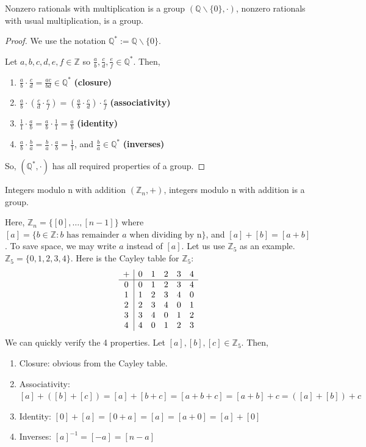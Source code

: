 \documentclass[12pt]{article}
\newcommand{\Z}{\mathbb{Z}}
\newcommand{\Q}{\mathbb{Q}}
\newcommand{\inv}{^{-1}}
\begin{document}
	\begin{myprop}{Nonzero rationals with multiplication is a group}{}
		$(\Q\backslash\{0\}, \cdot)$, nonzero rationals with usual multiplication, is a group. 
		\begin{proof}
			We use the notation $\Q^*:=\Q\backslash\{0\}$.
			
			Let $a, b, c, d, e, f\in\Z$ so $\frac{a}{b}, \frac{c}{d}, \frac{e}{f}\in\Q^*$. Then,
			\begin{enumerate}[label=(\roman*)]
				\item $\frac{a}{b}\cdot\frac{c}{d}=\frac{ac}{bd}\in\Q^*$ \textbf{(closure)}
				\item $\frac{a}{b}\cdot(\frac{c}{d}\cdot\frac{e}{f})=(\frac{a}{b}\cdot\frac{c}{d})\cdot\frac{e}{f}$ \textbf{(associativity)}
				\item $\frac{1}{1}\cdot\frac{a}{b}=\frac{a}{b}\cdot\frac{1}{1}=\frac{a}{b}$ \textbf{(identity)}
				\item $\frac{a}{b}\cdot\frac{b}{a}=\frac{b}{a}\cdot\frac{a}{b}=\frac{1}{1}$, and $\frac{b}{a}\in\Q^*$ \textbf{(inverses)}
			\end{enumerate}
			So, $(\Q^*, \cdot)$ has all required properties of a group.
		\end{proof}
	\end{myprop}
	
	\begin{myex}{Integers modulo n with addition}{}
		$(\Z_n, +)$, integers modulo n with addition is a group.
		
		Here, $\Z_n=\{[0], \dots, [n-1]\}$ where $[a]=\{b\in\Z:b\text{ has remainder $a$ when dividing by n}\}$, and $[a]+[b]=[a+b]$. To save space, we may write $a$ instead of $[a]$. Let us use $\Z_5$ as an example.\\
		
		$\Z_5=\{0, 1, 2, 3, 4\}$. Here is the Cayley table for $\Z_5$:
		\begin{align*}
			\begin{array}{c | ccccc}
			+ & 0 & 1 & 2 & 3 & 4 \\
			\hline
			0 & 0 & 1 & 2 & 3 & 4 \\
			1 & 1 & 2 & 3 & 4 & 0 \\
			2 & 2 & 3 & 4 & 0 & 1 \\
			3 & 3 & 4 & 0 & 1 & 2 \\
			4 & 4 & 0 & 1 & 2 & 3
			\end{array}
		\end{align*}
		We can quickly verify the 4 properties. Let $[a], [b], [c]\in\Z_5$. Then,
		\begin{enumerate}[label=(\roman*)]
			\item Closure: obvious from the Cayley table.
			\item Associativity: $[a]+([b]+[c])=[a]+[b+c]=[a+b+c]=[a+b]+c=([a]+[b])+c$
			\item Identity: $[0]+[a]=[0+a]=[a]=[a+0]=[a]+[0]$
			\item Inverses: $[a]\inv=[-a]=[n-a]$
		\end{enumerate}
	\end{myex}
	
\end{document}
